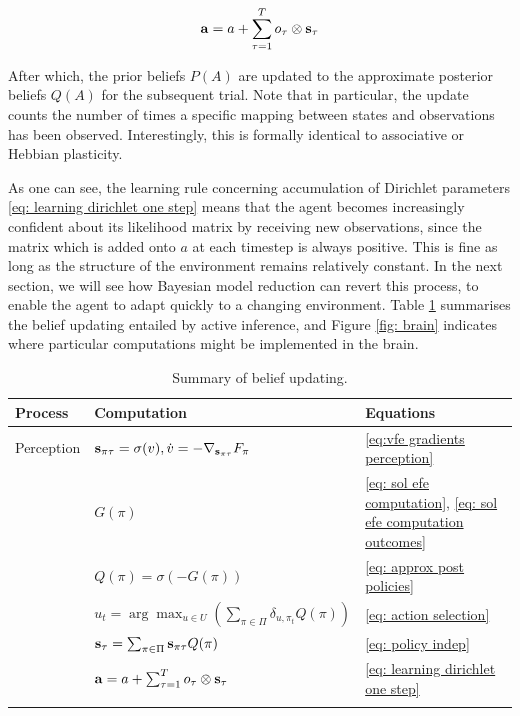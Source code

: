 \documentclass[review,12pt,authoryear]{elsarticle}
\begin{document}
	\begin{equation}
	\label{eq: learning dirichlet one step}
  	    \bold a=  a +\sum_{\tau =1}^T o_\tau \otimes \bold s_\tau
  	\end{equation}
  	
After which, the prior beliefs $P(A)$ are updated to the approximate posterior beliefs $Q(A)$ for the subsequent trial. Note that in particular, the update counts the number of times a specific mapping between states and observations has been observed. Interestingly, this is formally identical to associative or Hebbian plasticity.


As one can see, the learning rule concerning accumulation of Dirichlet parameters \eqref{eq: learning dirichlet one step} means that the agent becomes increasingly confident about its likelihood matrix by receiving new observations, since the matrix which is added onto $a$ at each timestep is always positive. This is fine as long as the structure of the environment remains relatively constant. In the next section, we will see how Bayesian model reduction can revert this process, to enable the agent to adapt quickly to a changing environment. Table \ref{table:3} summarises the belief updating entailed by active inference, and Figure \ref{fig: brain} indicates where particular computations might be implemented in the brain.

\begin{table}
    \centering
    \caption{Summary of belief updating.} \label{table:3}
\begin{tabular}{  m{4.5cm}  m{7cm} m{2.2cm} } 
            \toprule
            Process & Computation & Equations \\
            \midrule
             {Perception}	&  { $\bold s_{\pi \tau}= \sigma(v), \dot v = - \nabla_{\bold s _{\pi \tau}}F_{\pi} $} &{\eqref{eq:vfe gradients perception}} \\\addlinespace[0.3cm]
             {Planning}	&  {$G(\pi)$ } &{\eqref{eq: sol efe computation}, \eqref{eq: sol efe computation outcomes}} \\\addlinespace[0.3cm]
             {Decision-making}	&  {$Q(\pi)= \sigma(-G(\pi))$} &{\eqref{eq: approx post policies}} \\\addlinespace[0.3cm]
             {Action selection}	&  {$u_t = \arg \max_{u \in U } \left (\sum_{\pi \in \Pi} \delta_{u, \pi_t} Q(\pi)\right)$}&{\eqref{eq: action selection}} \\\addlinespace[0.3cm]
             {Policy-independent state-estimation}	&  {$\bold s_\tau = \sum_{\pi \in \Pi} \bold s_{\pi\tau} Q(\pi)$} &{\eqref{eq: policy indep}} \\\addlinespace[0.3cm]
             {Learning (end of trial)} &  {$\bold a=  a +\sum_{\tau =1}^T o_\tau \otimes \bold s_\tau$} &{\eqref{eq: learning dirichlet one step}} \\ \addlinespace[0.15cm]
            \bottomrule \addlinespace[0.15cm]
\end{tabular}
\end{table}
\end{document}
